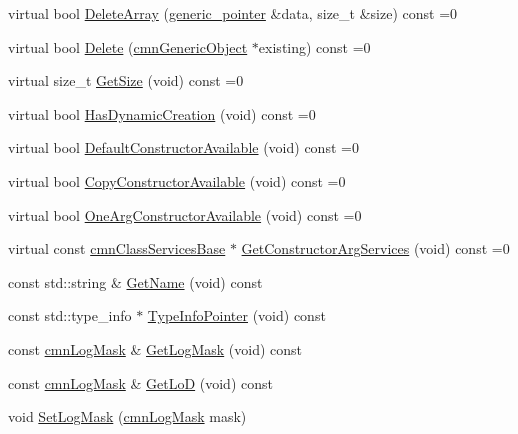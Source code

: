 \begin{DoxyCompactItemize}
\item 
virtual bool \hyperlink{classcmn_class_services_base_a064f40c7b44083e6dde4dab73705a13b}{Delete\+Array} (\hyperlink{classcmn_class_services_base_a859cb10b40a79b083c9ba0cae0d52afd}{generic\+\_\+pointer} \&data, size\+\_\+t \&size) const =0
\item 
virtual bool \hyperlink{classcmn_class_services_base_ad114ec7ebb4ca20987a40fe3de671420}{Delete} (\hyperlink{classcmn_generic_object}{cmn\+Generic\+Object} $\ast$existing) const =0
\item 
virtual size\+\_\+t \hyperlink{classcmn_class_services_base_a5f84c2e034081d247d11429ccea17cf8}{Get\+Size} (void) const =0
\item 
virtual bool \hyperlink{classcmn_class_services_base_ad7efca19b748d8405cf0a0b485e8b371}{Has\+Dynamic\+Creation} (void) const =0
\item 
virtual bool \hyperlink{classcmn_class_services_base_a031919fb27ef1fd50b68ec2c8b1870ac}{Default\+Constructor\+Available} (void) const =0
\item 
virtual bool \hyperlink{classcmn_class_services_base_a23cfad31fa8f863a05866b2bd13967e9}{Copy\+Constructor\+Available} (void) const =0
\item 
virtual bool \hyperlink{classcmn_class_services_base_a57f4ce8f78268ca150c1cf251555f026}{One\+Arg\+Constructor\+Available} (void) const =0
\item 
virtual const \hyperlink{classcmn_class_services_base}{cmn\+Class\+Services\+Base} $\ast$ \hyperlink{classcmn_class_services_base_ac4ba1d3ecd54ccfa2aa30f0a80d296df}{Get\+Constructor\+Arg\+Services} (void) const =0
\item 
const std\+::string \& \hyperlink{classcmn_class_services_base_a45478b7cf3deb0ce224821cd0669ce29}{Get\+Name} (void) const 
\item 
const std\+::type\+\_\+info $\ast$ \hyperlink{classcmn_class_services_base_a92f4d8a44cc760bd73e0371b2ca33157}{Type\+Info\+Pointer} (void) const 
\item 
const \hyperlink{cmn_log_lo_d_8h_a44b6ef7560b0d204460b0a54f1a5d702}{cmn\+Log\+Mask} \& \hyperlink{classcmn_class_services_base_a4bdade65dff5b54cc32f02023f031955}{Get\+Log\+Mask} (void) const 
\item 
const \hyperlink{cmn_log_lo_d_8h_a44b6ef7560b0d204460b0a54f1a5d702}{cmn\+Log\+Mask} \& \hyperlink{classcmn_class_services_base_acab983d9c0ba61c62587ca2ba71fee5b}{Get\+Lo\+D} (void) const 
\item 
void \hyperlink{classcmn_class_services_base_a18cf2a5cfc3915a580be3aaebedaa73e}{Set\+Log\+Mask} (\hyperlink{cmn_log_lo_d_8h_a44b6ef7560b0d204460b0a54f1a5d702}{cmn\+Log\+Mask} mask)

\end{DoxyCompactItemize}
